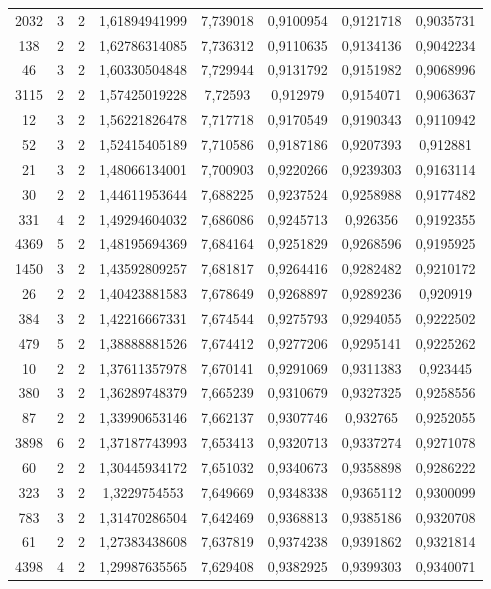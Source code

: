 \begin{longtable}{|c|c|c|c|c|c|c|c|}
2032 & 3 & 2 & 1,61894941999 & 7,739018 & 0,9100954 & 0,9121718 & 0,9035731 \\
138 & 2 & 2 & 1,62786314085 & 7,736312 & 0,9110635 & 0,9134136 & 0,9042234 \\
46 & 3 & 2 & 1,60330504848 & 7,729944 & 0,9131792 & 0,9151982 & 0,9068996 \\
3115 & 2 & 2 & 1,57425019228 & 7,72593 & 0,912979 & 0,9154071 & 0,9063637 \\
12 & 3 & 2 & 1,56221826478 & 7,717718 & 0,9170549 & 0,9190343 & 0,9110942 \\
52 & 3 & 2 & 1,52415405189 & 7,710586 & 0,9187186 & 0,9207393 & 0,912881 \\
21 & 3 & 2 & 1,48066134001 & 7,700903 & 0,9220266 & 0,9239303 & 0,9163114 \\
30 & 2 & 2 & 1,44611953644 & 7,688225 & 0,9237524 & 0,9258988 & 0,9177482 \\
331 & 4 & 2 & 1,49294604032 & 7,686086 & 0,9245713 & 0,926356 & 0,9192355 \\
4369 & 5 & 2 & 1,48195694369 & 7,684164 & 0,9251829 & 0,9268596 & 0,9195925 \\
1450 & 3 & 2 & 1,43592809257 & 7,681817 & 0,9264416 & 0,9282482 & 0,9210172 \\
26 & 2 & 2 & 1,40423881583 & 7,678649 & 0,9268897 & 0,9289236 & 0,920919 \\
384 & 3 & 2 & 1,42216667331 & 7,674544 & 0,9275793 & 0,9294055 & 0,9222502 \\
479 & 5 & 2 & 1,38888881526 & 7,674412 & 0,9277206 & 0,9295141 & 0,9225262 \\
10 & 2 & 2 & 1,37611357978 & 7,670141 & 0,9291069 & 0,9311383 & 0,923445 \\
380 & 3 & 2 & 1,36289748379 & 7,665239 & 0,9310679 & 0,9327325 & 0,9258556 \\
87 & 2 & 2 & 1,33990653146 & 7,662137 & 0,9307746 & 0,932765 & 0,9252055 \\
3898 & 6 & 2 & 1,37187743993 & 7,653413 & 0,9320713 & 0,9337274 & 0,9271078 \\
60 & 2 & 2 & 1,30445934172 & 7,651032 & 0,9340673 & 0,9358898 & 0,9286222 \\
323 & 3 & 2 & 1,3229754553 & 7,649669 & 0,9348338 & 0,9365112 & 0,9300099 \\
783 & 3 & 2 & 1,31470286504 & 7,642469 & 0,9368813 & 0,9385186 & 0,9320708 \\
61 & 2 & 2 & 1,27383438608 & 7,637819 & 0,9374238 & 0,9391862 & 0,9321814 \\
4398 & 4 & 2 & 1,29987635565 & 7,629408 & 0,9382925 & 0,9399303 & 0,9340071 \\

\end{longtable}
